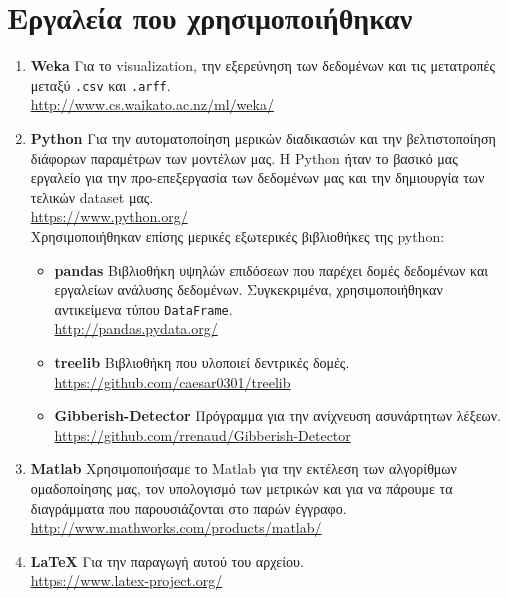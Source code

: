 \section{Εργαλεία που χρησιμοποιήθηκαν}
\begin{enumerate}
	\item \textbf{Weka}
	Για το visualization, την εξερεύνηση των δεδομένων
	και τις μετατροπές μεταξύ \texttt{.csv} και \texttt{.arff}.
	\\\url{http://www.cs.waikato.ac.nz/ml/weka/}
	
	\item \textbf{Python}
	Για την αυτοματοποίηση μερικών διαδικασιών
	και την βελτιστοποίηση διάφορων παραμέτρων των μοντέλων μας.
	Η Python ήταν το βασικό μας εργαλείο για την προ-επεξεργασία των δεδομένων μας και την δημιουργία των τελικών dataset μας.
	\\\url{https://www.python.org/}\\
	Χρησιμοποιήθηκαν επίσης μερικές εξωτερικές βιβλιοθήκες της python:
	\begin{itemize}
    	\item \textbf{pandas} Βιβλιοθήκη υψηλών επιδόσεων που παρέχει δομές δεδομένων και εργαλείων ανάλυσης δεδομένων.
    	Συγκεκριμένα, χρησιμοποιήθηκαν αντικείμενα τύπου \lstinline!DataFrame!.
    	\\\url{http://pandas.pydata.org/}
    	
    	\item \textbf{treelib} Βιβλιοθήκη που υλοποιεί δεντρικές δομές.
    	\\\url{https://github.com/caesar0301/treelib}
    	
    	\item \textbf{Gibberish-Detector} Πρόγραμμα για την ανίχνευση ασυνάρτητων λέξεων.
    	\\\url{https://github.com/rrenaud/Gibberish-Detector}
	\end{itemize}
	
	\item \textbf{Matlab{}}
	Χρησιμοποιήσαμε το Matlab για την εκτέλεση των αλγορίθμων ομαδοποίησης μας, τον υπολογισμό των μετρικών και για να πάρουμε τα διαγράμματα που παρουσιάζονται στο παρών έγγραφο.
	\\\url{http://www.mathworks.com/products/matlab/}
	
	\item \textbf{\LaTeX{}}
	Για την παραγωγή αυτού του αρχείου.
	\\\url{https://www.latex-project.org/}
\end{enumerate}